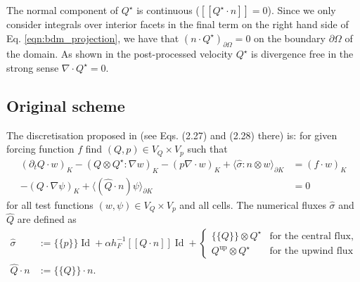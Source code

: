 \documentclass[11pt]{article}
\newcommand{\jump}[1]{[\![ #1]\!]}
\newcommand{\avg}[1]{\{\!\{#1\}\!\}}
\newcommand{\Id}{\operatorname{Id}}
\begin{document}
The normal component of $Q^\star$ is continuous ($\jump{Q^\star\cdot n} = 0$). Since we only consider integrals over interior facets in the final term on the right hand side of Eq. \eqref{eqn:bdm_projection}, we have that $(n\cdot Q^\star)_{\partial \Omega} = 0$ on the boundary $\partial\Omega$ of the domain. As shown in \cite{Guzman2016} the post-processed velocity $Q^\star$ is divergence free in the strong sense $\nabla \cdot Q^\star=0$.
\subsection{Original scheme}
The discretisation proposed in \cite{Guzman2016} (see Eqs. (2.27) and (2.28) there) is: for given forcing function $f$ find $(Q,p)\in V_Q\times V_p$ such that
\begin{equation}
    \begin{aligned}
        (\partial_t Q\cdot w)_{K} - (Q\otimes Q^\star:\nabla w)_{K} - (p\nabla\cdot w)_{K} + \langle \widehat{\sigma}: n\otimes w \rangle_{\partial K} & = (f\cdot w)_{K} \\
        - (Q\cdot \nabla \psi)_{K} + \langle (\widehat{Q}\cdot n)\psi\rangle_{\partial K}                                                              & =0
    \end{aligned}
\end{equation}
for all test functions $(w,\psi)\in V_Q\times V_p$ and all cells. The numerical fluxes $\widehat{\sigma}$ and $\widehat{Q}$ are defined as
\begin{equation}
    \begin{aligned}
        \widehat{\sigma}   & := \avg{p} \Id  + \alpha h_F^{-1} \jump{Q\cdot n} \Id       + \begin{cases}
                                                                                               \avg{Q}\otimes Q^\star       & \text{for the central flux}, \\
                                                                                               Q^{\text{up}}\otimes Q^\star & \text{for the upwind flux}
                                                                                           \end{cases} \\
        \widehat{Q}\cdot n & := \avg{Q}\cdot n.
    \end{aligned}\label{eqn:flux_original}
\end{equation}
\end{document}
